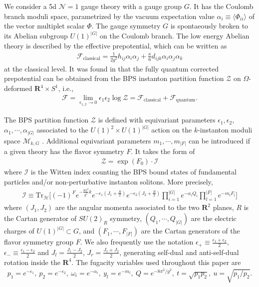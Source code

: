 \documentclass[letterpaper, 11pt]{article}
\begin{document}
We consider a 5d $\mathcal{N}=1$ gauge theory with a gauge group $G$. It has the Coulomb branch moduli space, parametrized by the vacuum expectation value $\alpha_i\equiv \langle\Phi_{ii}\rangle $ of the vector multiplet scalar $\Phi$. The gauge symmetry $G$ is spontaeously broken to its Abelian subgroup $U(1)^{|G|}$ on the Coulomb branch. The low energy Abelian theory is described by the effective prepotential, which can be written as \cite{Intriligator:1997pq}
\begin{align}
	\mathcal{F}_\text{classical} = \frac{1}{2g^2}h_{ij}\alpha_i \alpha_j + \frac{\kappa}{6}d_{ijk}\alpha_i\alpha_j\alpha_k 
\end{align}
at the classical level. It was found in \cite{Nekrasov:2002qd,Nekrasov:2003rj} that the fully quantum corrected prepotential can be obtained from the BPS instanton partition function $\mathcal{Z}$ on $\Omega$-deformed $\mathbf{R}^4 \times S^1$, i.e.,
\begin{align}
	\mathcal{F} = \lim_{\epsilon_{1,2}\rightarrow 0} \epsilon_1 \epsilon_2 \log{\mathcal{Z}} = \mathcal{F}_\text{classical} + \mathcal{F}_\text{quantum}.
\end{align}

The BPS partition function $\mathcal{Z}$ is defined with equivariant parameters $\epsilon_{1}, \epsilon_2$, $\alpha_1, \cdots, \alpha_{|G|}$ associated to the $U(1)^2 \times U(1)^{|G|}$ action on the $k$-instanton moduli space $\mathcal{M}_{k,G}$  \cite{Nekrasov:2002qd,Nekrasov:2003rj}. Additional equivariant parameters $m_1, \cdots, m_{|F|}$ can be introduced if a given theory has the flavor symmetry $F$. It takes the form of 
\begin{align}
    \mathcal{Z} = \exp{(F_0)} \cdot \mathcal{I}
\end{align}
where $\mathcal{I}$ is the Witten index counting the BPS bound states of fundamental particles and/or non-perturbative instanton solitons. More precisely, 
\begin{align}
	\mathcal{I} \equiv \text{Tr}_{\mathcal{H}} \bigg[(-1)^F e^{-\frac{8\pi^2}{g^2} k} e^{-\epsilon_1 (J_1+\frac{R}{2})} e^{-\epsilon_2 (J_2+\frac{R}{2})} \prod_{i=1}^{|G|} e^{-\alpha_i Q_i} \prod_{l=1}^{|F|} e^{-m_l F_l}\bigg]
\end{align}
where $(J_1, J_2)$ are the angular momenta associated to the two $\mathbf{R}^2$ planes, $R$ is the Cartan generator of $SU(2)_R$ symmetry, $(Q_1, \cdots, Q_{|G|})$ are the electric charges of $U(1)^{|G|} \subset G$, and $(F_1, \cdots, F_{|F|})$ are the Cartan generators of the flavor symmetry group $F$. 
We also frequently use the notation $\epsilon_+ \equiv \frac{\epsilon_1 + \epsilon_2}{2}$, $\epsilon_- \equiv \frac{\epsilon_1 - \epsilon_2}{2}$ and $J_l = \frac{J_1 - J_2}{2}$, $J_r = \frac{J_1 + J_2}{2}$, generating self-dual and anti-self-dual rotation inside the $\mathbf{R}^4$.
The fugacity variables used throughout this paper are 
\begin{align}
    p_1 = e^{-\epsilon_1},\ p_2 = e^{-\epsilon_2},\ \omega_i = e^{-\alpha_i},\ y_l = e^{-m_l},\ Q = e^{-8\pi^2  /g^2},\ t = \sqrt{p_1p_2},\  u = \sqrt{p_1/p_2}.
\end{align}
\end{document}
